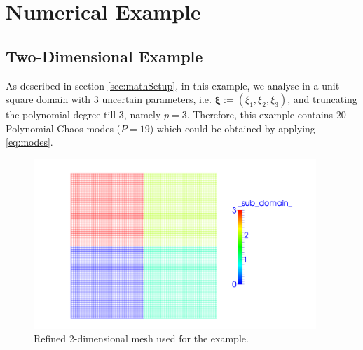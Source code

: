 \documentclass{article}
\begin{document}
\pagebreak
\section{Numerical Example}
\label{sec:example}

\subsection{Two-Dimensional Example}

As described in section \ref{sec:mathSetup}, in this example, we analyse in a unit-square domain with $3$ uncertain parameters, i.e. $\bm{\xi} := (\xi_1, \xi_2, \xi_3)$, and truncating the polynomial degree till $3$, namely $p=3$. Therefore, this example contains $20$ Polynomial Chaos modes ($P=19$) which could be obtained by applying \eqref{eq:modes}.


\begin{figure}[h!]
  \centering
    \includegraphics[width=0.95\textwidth]{fig/mesh.pdf}
  \caption{Refined 2-dimensional mesh used for the example.}
  \label{fig:mesh}
\end{figure}
\end{document}
